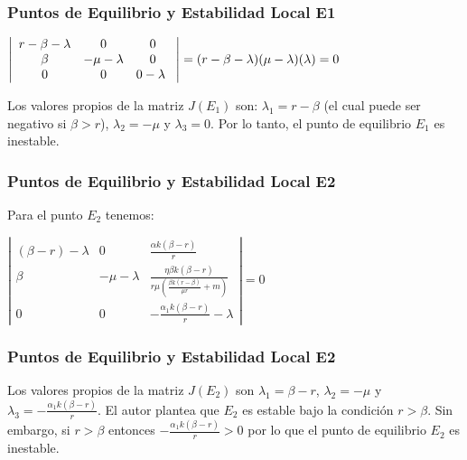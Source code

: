 \documentclass{beamer}
\begin{document}
\begin{frame}
	\frametitle{Puntos de Equilibrio y Estabilidad Local E1}
	\begin{center}
		$\left|\begin{array}{c c c}
				r-\beta-\lambda & 0            & 0 \\
				\beta           & -\mu-\lambda & 0 \\
				0               & 0            & 0-\lambda \
			\end{array} \right|
			=
			(r-\beta-\lambda)(\mu-\lambda)(\lambda) = 0$
	\end{center}
\bigskip
Los valores propios de la matriz $J(E_1)$ son: $\lambda_1 = r-\beta$ (el cual puede ser negativo si $\beta>r$), $\lambda_2= -\mu$ y $\lambda_3 = 0$. Por lo tanto, el punto de equilibrio $E_1$ es inestable.
\end{frame}


 \begin{frame}
 	\frametitle{Puntos de Equilibrio y Estabilidad Local E2}
 	\begin{minipage}{10cm}
 		Para el punto $E_2$ tenemos:\\
 		
 			\begin{center}
 				
 			
 				                        $ \left|\begin{array}{ccc}
 					                           (\beta-r)-\lambda & 0            & \frac{\alpha k(\beta-r)}{r}                                                      \\
 					                           \beta             & -\mu-\lambda & \frac{\eta \beta k(\beta-r)}{r \mu\left(\frac{\beta k(r-\beta)}{\mu r}+m\right)} \\
 					                           0                 & 0            & -\frac{\alpha_1 k(\beta-r)}{r} - \lambda
 				                           \end{array}\right|=0$
 		
 		\end{center}
 	\end{minipage}
 \end{frame}


\begin{frame}
	\frametitle{Puntos de Equilibrio y Estabilidad Local E2}
	\begin{minipage}{10cm}
		
		Los valores propios de la matriz $J(E_2)$ son $\lambda_1 = \beta-r$, $\lambda_2=-\mu$ y $\lambda_3=-\frac{\alpha_1 k(\beta-r)}{r}$.
		El autor plantea que $E_2$ es estable bajo la condición $r>\beta$.
		Sin embargo, si $r>\beta$ entonces $-\frac{\alpha_1 k(\beta-r)}{r} > 0$ por lo que el punto de equilibrio $E_2$ es inestable. \par
	\end{minipage}
\end{frame}
\end{document}

